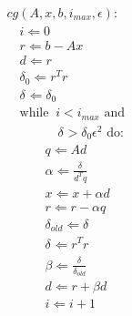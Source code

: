 \begin{equation*}
\begin{split}
& cg(A,x,b,i_{max},\epsilon): \\
& \quad i \Leftarrow 0 \\
& \quad r \Leftarrow b - A x \\
& \quad d \Leftarrow r \\
& \quad \delta_{0} \Leftarrow r^T r \\
& \quad \delta_{   } \Leftarrow \delta_{0} \\
& \quad \text{while}\;\; i < i_{max} \text{ and } \\
& \quad\quad\qquad  \delta_{   } > \delta_{0} \epsilon^2 \text{ do} :\\
& \quad\quad\quad  q \Leftarrow Ad \\
& \quad\quad\quad  \alpha \Leftarrow \frac{\delta_{   }}{d^T q} \\
& \quad\quad\quad  x \Leftarrow x + \alpha d\\
& \quad\quad\quad  r \Leftarrow r - \alpha q\\
& \quad\quad\quad  \delta_{old} \Leftarrow \delta_{   } \\
& \quad\quad\quad  \delta_{   } \Leftarrow r^T r \\
& \quad\quad\quad  \beta \Leftarrow \frac{\delta_{   }}{\delta_{old}} \\
& \quad\quad\quad  d \Leftarrow r + \beta d\\
& \quad\quad\quad  i \Leftarrow i + 1
\end{split}
\end{equation*}
